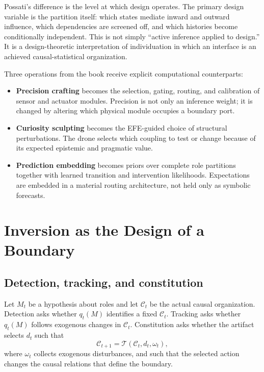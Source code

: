 \documentclass[11pt,a4paper]{article}
\numberwithin{equation}{section}
\newcommand{\Corg}{\mathcal{C}}
\newcommand{\Tmap}{\mathcal{T}}
\begin{document}
Possati's difference is the level at which design operates. The primary
design variable is the partition itself: which states mediate inward and
outward influence, which dependencies are screened off, and which histories
become conditionally independent. This is not simply ``active inference
applied to design.'' It is a design-theoretic interpretation of individuation
in which an interface is an achieved causal-statistical organization.

Three operations from the book receive explicit computational counterparts:
\begin{itemize}
  \item \textbf{Precision crafting} becomes the selection, gating, routing,
  and calibration of sensor and actuator modules. Precision is not only an
  inference weight; it is changed by altering which physical module occupies
  a boundary port.
  \item \textbf{Curiosity sculpting} becomes the EFE-guided choice of
  structural perturbations. The drone selects which coupling to test or
  change because of its expected epistemic and pragmatic value.
  \item \textbf{Prediction embedding} becomes priors over complete role
  partitions together with learned transition and intervention likelihoods.
  Expectations are embedded in a material routing architecture, not held only
  as symbolic forecasts.
\end{itemize}

\section{Inversion as the Design of a Boundary}

\subsection{Detection, tracking, and constitution}

Let $M_t$ be a hypothesis about roles and let $\Corg_t$ be the actual causal
organization. Detection asks whether $q_t(M)$ identifies a fixed
$\Corg_t$. Tracking asks whether $q_t(M)$ follows exogenous changes in
$\Corg_t$. Constitution asks whether the artifact selects $d_t$ such that
\begin{equation}
 \Corg_{t+1}=\Tmap(\Corg_t,d_t,\omega_t),
 \label{eq:constitutive-transition}
\end{equation}
where $\omega_t$ collects exogenous disturbances, and such that the selected
action changes the causal relations that define the boundary.
\end{document}
